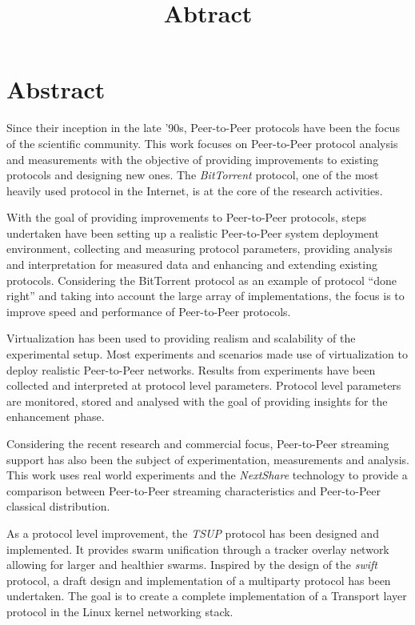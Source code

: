 \documentclass[11pt,a4paper]{article}
\title{Abtract}
\date{}
\begin{document}
\thispagestyle{empty}
\pagestyle{empty}

\section*{Abstract}

Since their inception in the late '90s, Peer-to-Peer protocols have been the
focus of the scientific community. This work focuses on Peer-to-Peer protocol
analysis and measurements with the objective of providing improvements to
existing protocols and designing new ones. The \textit{BitTorrent} protocol,
one of the most heavily used protocol in the Internet, is at the core of the
research activities.

With the goal of providing improvements to Peer-to-Peer protocols, steps
undertaken have been setting up a realistic Peer-to-Peer system deployment
environment, collecting and measuring protocol parameters, providing analysis
and interpretation for measured data and enhancing and extending existing
protocols. Considering the BitTorrent protocol as an example of protocol
``done right'' and taking into account the large array of implementations, the
focus is to improve speed and performance of Peer-to-Peer protocols.

Virtualization has been used to providing realism and scalability of the
experimental setup. Most experiments and scenarios made use of virtualization
to deploy realistic Peer-to-Peer networks. Results from experiments have been
collected and interpreted at protocol level parameters. Protocol level
parameters are monitored, stored and analysed with the goal of providing
insights for the enhancement phase.

Considering the recent research and commercial focus, Peer-to-Peer streaming
support has also been the subject of experimentation, measurements and
analysis. This work uses real world experiments and the \textit{NextShare}
technology to provide a comparison between Peer-to-Peer streaming
characteristics and Peer-to-Peer classical distribution.

As a protocol level improvement, the \textit{TSUP} protocol has been designed
and implemented. It provides swarm unification through a tracker overlay
network allowing for larger and healthier swarms. Inspired by the design of
the \textit{swift} protocol, a draft design and implementation of a multiparty
protocol has been undertaken. The goal is to create a complete implementation
of a Transport layer protocol in the Linux kernel networking stack.
\end{document}
